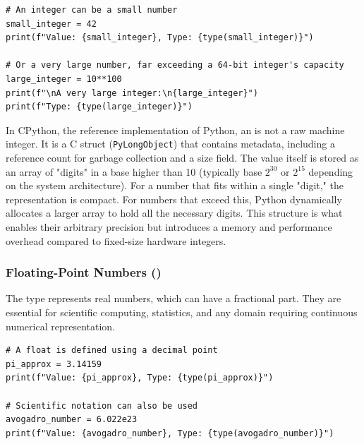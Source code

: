 \text{ }\begin{verbatim}
# An integer can be a small number
small_integer = 42
print(f"Value: {small_integer}, Type: {type(small_integer)}")

# Or a very large number, far exceeding a 64-bit integer's capacity
large_integer = 10**100
print(f"\nA very large integer:\n{large_integer}")
print(f"Type: {type(large_integer)}")
\end{verbatim}

\begin{remark}
In CPython, the reference implementation of Python, an  is not a raw machine integer. It is a C struct (\texttt{PyLongObject}) that contains metadata, including a reference count for garbage collection and a size field. The value itself is stored as an array of "digits" in a base higher than 10 (typically base $2^{30}$ or $2^{15}$ depending on the system architecture). For a number that fits within a single "digit," the representation is compact. For numbers that exceed this, Python dynamically allocates a larger array to hold all the necessary digits. This structure is what enables their arbitrary precision but introduces a memory and performance overhead compared to fixed-size hardware integers.
\end{remark}

\subsubsection*{Floating-Point Numbers ()}
The  type represents real numbers, which can have a fractional part. They are essential for scientific computing, statistics, and any domain requiring continuous numerical representation.

\text{ }\begin{verbatim}
# A float is defined using a decimal point
pi_approx = 3.14159
print(f"Value: {pi_approx}, Type: {type(pi_approx)}")

# Scientific notation can also be used
avogadro_number = 6.022e23
print(f"Value: {avogadro_number}, Type: {type(avogadro_number)}")
\end{verbatim}

